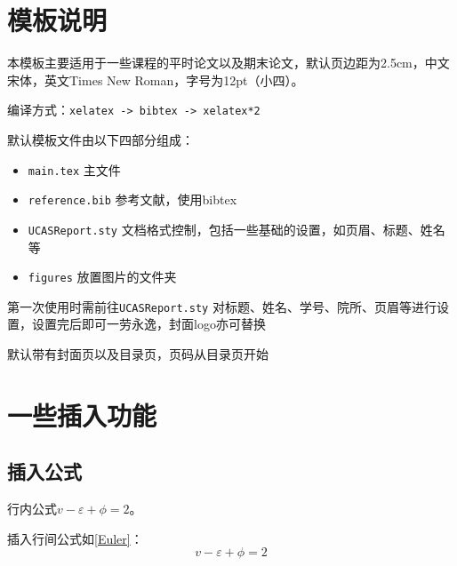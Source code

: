 \documentclass[12pt,hyperref,a4paper,UTF8]{ctexart}
\begin{document}
\cover

%
%

\thispagestyle{empty} %

\newpage
\tableofcontents

\newpage


\section{模板说明}
本模板主要适用于一些课程的平时论文以及期末论文，默认页边距为2.5cm，中文宋体，英文Times New Roman，字号为12pt（小四）。

编译方式：\verb|xelatex -> bibtex -> xelatex*2|


默认模板文件由以下四部分组成：
\begin{itemize}
    \item \texttt{main.tex} 主文件
    \item \texttt{reference.bib} 参考文献，使用bibtex
    \item \texttt{UCASReport.sty} 文档格式控制，包括一些基础的设置，如页眉、标题、姓名等
    \item \texttt{figures} 放置图片的文件夹
\end{itemize}

第一次使用时需前往\texttt{UCASReport.sty} 对标题、姓名、学号、院所、页眉等进行设置，设置完后即可一劳永逸，封面logo亦可替换

默认带有封面页以及目录页，页码从目录页开始

\section{一些插入功能}
\subsection{插入公式}
行内公式$v-\varepsilon+\phi=2$。

插入行间公式如\autoref{Euler}：
\begin{equation}
    v-\varepsilon+\phi=2
    \label{Euler}
\end{equation}
\end{document}
